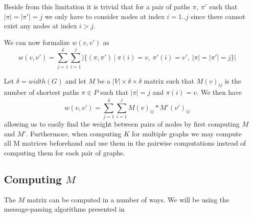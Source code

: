 \documentclass{article}
\renewenvironment{proof}[1][\proofname]{{\bfseries #1.}}{\qed}
\begin{document}

Beside from this limitation it is trivial that for a pair of paths $\pi,\ \pi'$ such that $|\pi|=|\pi'|=j$ we only have to consider nodes at index $i=1..j$ since there cannot exist any nodes at index $i>j$.


We can now formalize $w(v,v')$ as
\begin{equation}
w(v,v')=\sum_{j=1}^{\delta}\sum_{i=1}^{j}|\{(\pi, \pi')\ |\ \pi(i)=v,\ \pi'(i)=v',\ |\pi|=|\pi'|=j\}|
\end{equation}


Let $\delta=width(G)$ and let $M$ be a $|V|\times\delta\times\delta$ matrix such that $M(v)_{ij}$ is the number of shortest paths $\pi\in P$ such that $|\pi|=j$ and $\pi(i)=v$. We then have
\begin{equation}
w(v,v')=\sum_{j=1}^{\delta}\sum_{i=1}^{j}M(v)_{ij}*M'(v')_{ij}
\label{eq:wmm}
\end{equation}
allowing us to easily find the weight between pairs of nodes by first computing $M$ and $M'$. Furthermore, when computing $K$ for multiple graphs we may compute all M matrices beforehand and use them in the pairwise computations instead of computing them for each pair of graphs.


\subsection{Computing $M$}
The $M$ matrix can be computed in a number of ways. We will be using the message-passing algorithms presented in \cite{graphhopper}
\end{document}
